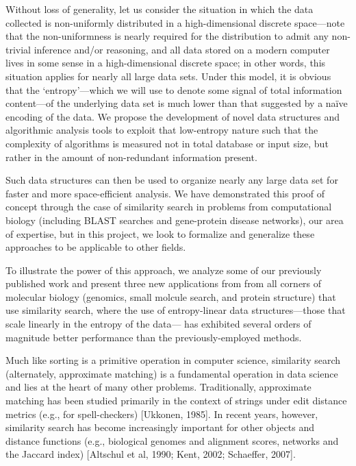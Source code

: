 \documentclass{amsbook}
\theoremstyle{definition}
\theoremstyle{remark}
\numberwithin{equation}{section}
\begin{document}
Without loss of generality, let us consider the situation in which the data collected is non-uniformly distributed in a high-dimensional discrete space—note that the non-uniformness is nearly required for the distribution to admit any non-trivial inference and/or reasoning, and all data stored on a modern computer lives in some sense in a high-dimensional discrete space; in other words, this situation applies for nearly all large data sets.
Under this model, it is obvious that the `entropy'—which we will use to denote some signal of total information content—of the underlying data set is much lower than that suggested by a naïve encoding of the data.
We propose the development of novel data structures and algorithmic analysis tools to exploit that low-entropy nature such that the complexity of algorithms is measured not in total database or input size, but rather in the amount of non-redundant information present.

Such data structures can then be used to organize nearly any large data set for faster and more space-efficient analysis.
We have demonstrated this proof of concept through the case of similarity search in problems from computational biology (including BLAST searches and gene-protein disease networks), our area of expertise, but in this project, we look to formalize and generalize these approaches to be applicable to other fields.

To illustrate the power of this approach, we analyze some of our previously published work and present three new applications from from all corners of molecular biology (genomics, small molcule search, and protein structure) that use similarity search, where the use of entropy-linear data structures—those that scale linearly in the entropy of the data— has exhibited several orders of magnitude better performance than the previously-employed methods.

Much like sorting is a primitive operation in computer science, similarity search (alternately, approximate matching) is a fundamental operation in data science and lies at the heart of many other problems.
Traditionally, approximate matching has been studied primarily in the context of strings under edit distance metrics (e.g., for spell-checkers) [Ukkonen, 1985].
In recent years, however, similarity search has become increasingly important for other objects and distance functions (e.g., biological genomes and alignment scores, networks and the Jaccard index) [Altschul et al, 1990; Kent, 2002; Schaeffer, 2007].
\end{document}
